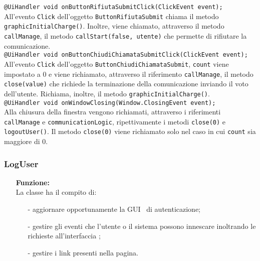 {\begin{sloppypar}
{{\begin{itemize}
				\texttt{@UiHandler void onButtonRifiutaSubmitClick(ClickEvent event);}\\
				All'evento \texttt{Click} dell'oggetto \texttt{ButtonRifiutaSubmit} chiama il metodo \texttt{graphicInitialCharge()}. 
				Inoltre, viene chiamato, attraverso il metodo \texttt{callManage}, il metodo \texttt{callStart(false, utente)} 
				che permette di rifiutare la comunicazione.\\

				\texttt{@UiHandler void onButtonChiudiChiamataSubmitClick(ClickEvent event);}\\
				All'evento \texttt{Click} dell'oggetto \texttt{ButtonChiudiChiamataSubmit}, \texttt{count} viene impostato a 0 e viene richiamato, attraverso il riferimento \texttt{callManage}, il metodo \texttt{close(value)} che richiede la 
				terminazione della comunicazione inviando il voto dell'utente. Richiama, inoltre, il metodo 
				\texttt{graphicInitialCharge()}.\\

				\texttt{@UiHandler void onWindowClosing(Window.ClosingEvent event);}\\
				Alla chiusura della finestra vengono richiamati, attraverso i riferimenti \texttt{callManage} e 
				\texttt{communicationLogic}, ripettivamente i metodi \texttt{close(0)} e \texttt{logoutUser()}. 
				Il metodo \texttt{close(0)} viene richiamato solo nel caso in cui \texttt{count} sia maggiore di 0.\\
				
			\end{itemize}
		}
		
		\subsubsection{LogUser}\label{ssub:LogUser}{
		\begin{itemize}
			\item[] \textbf{Funzione:}\\
				  La classe ha il compito di:
				\begin{itemize}
					\item[-] aggiornare opportunamente la GUI\g~ di autenticazione;
					\item[-] gestire gli eventi che l'utente o il sistema possono innescare inoltrando le richieste all'interfaccia ;
					\item[-] gestire i link presenti nella pagina.\\
				\end{itemize}
				

\end{itemize}}}
\end{sloppypar}}
